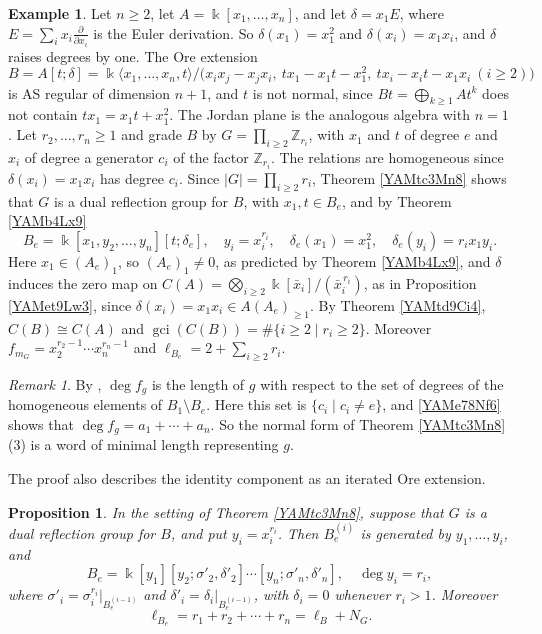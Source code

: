 \documentclass[reqno]{amsart}
\numberwithin{equation}{section}
\newtheorem{proposition}[equation]{Proposition}
\theoremstyle{definition}
\newtheorem{example}[equation]{Example}
\theoremstyle{remark}
\newtheorem{remark}[equation]{Remark}
\theoremstyle{plain}
\newcommand{\kk}{\Bbbk}
\DeclareMathOperator{\gci}{gci}
\begin{document}
\begin{example}\label{YAMex7Eu1}
Let $n\ge2$, let $A=\kk[x_1,\dots,x_n]$, and let $\delta=x_1E$, where $E=\sum_ix_i\frac{\partial}{\partial x_i}$ is the Euler derivation. So $\delta(x_1)=x_1^2$ and $\delta(x_i)=x_1x_i$, and $\delta$ raises degrees by one. The Ore extension
\[
B=A[t;\delta]=\kk\langle x_1,\dots,x_n,t\rangle/\big(x_ix_j-x_jx_i,\ tx_1-x_1t-x_1^2,\ tx_i-x_it-x_1x_i\ (i\ge2)\big)
\]
is AS regular of dimension $n+1$, and $t$ is not normal, since $Bt=\bigoplus_{k\ge1}At^k$ does not contain $tx_1=x_1t+x_1^2$. The Jordan plane is the analogous algebra with $n=1$. Let $r_2,\dots,r_n\ge1$ and grade $B$ by $G=\prod_{i\ge2}\mathbb Z_{r_i}$, with $x_1$ and $t$ of degree $e$ and $x_i$ of degree a generator $c_i$ of the factor $\mathbb Z_{r_i}$. The relations are homogeneous since $\delta(x_i)=x_1x_i$ has degree $c_i$. Since $|G|=\prod_{i\ge2}r_i$, Theorem \ref{YAMtc3Mn8} shows that $G$ is a dual reflection group for $B$, with $x_1,t\in B_e$, and by Theorem \ref{YAMb4Lx9}
\[
B_e=\kk[x_1,y_2,\dots,y_n][t;\delta_e],\quad y_i=x_i^{r_i},\quad\delta_e(x_1)=x_1^2,\quad\delta_e(y_i)=r_ix_1y_i.
\]
Here $x_1\in(A_e)_1$, so $(A_e)_1\neq0$, as predicted by Theorem \ref{YAMb4Lx9}, and $\delta$ induces the zero map on $C(A)=\bigotimes_{i\ge2}\kk[\bar x_i]/(\bar x_i^{\,r_i})$, as in Proposition \ref{YAMet9Lw3}, since $\delta(x_i)=x_1x_i\in A(A_e)_{\ge1}$. By Theorem \ref{YAMtd9Ci4}, $C(B)\cong C(A)$ and $\gci(C(B))=\#\{i\ge2\mid r_i\ge2\}$. Moreover $f_{m_G}=x_2^{r_2-1}\cdots x_n^{r_n-1}$ and $\ell_{B_e}=2+\sum_{i\ge2}r_i$.
\end{example}

\begin{remark}\label{YAMrm6Br1}
By \cite[Theorem 0.3(3)]{KKZ}, $\deg f_g$ is the length of $g$ with respect to the set of degrees of the homogeneous elements of $B_1\setminus B_e$. Here this set is $\{c_i\mid c_i\neq e\}$, and \eqref{YAMe78Nf6} shows that $\deg f_g=a_1+\cdots+a_n$. So the normal form of Theorem \ref{YAMtc3Mn8}(3) is a word of minimal length representing $g$.
\end{remark}

The proof also describes the identity component as an iterated Ore extension.

\begin{proposition}\label{YAMp7Ie3}
In the setting of Theorem \ref{YAMtc3Mn8}, suppose that $G$ is a dual reflection group for $B$, and put $y_i=x_i^{r_i}$. Then $B^{(i)}_e$ is generated by $y_1,\dots,y_i$, and
\begin{equation}\label{YAMe77Ie5}
B_e=\kk[y_1][y_2;\sigma'_2,\delta'_2]\cdots[y_n;\sigma'_n,\delta'_n],\quad\deg y_i=r_i,
\end{equation}
where $\sigma'_i=\sigma_i^{r_i}|_{B^{(i-1)}_e}$ and $\delta'_i=\delta_i|_{B^{(i-1)}_e}$, with $\delta_i=0$ whenever $r_i>1$. Moreover
\begin{equation}\label{YAMe77Ie6}
\ell_{B_e}=r_1+r_2+\cdots+r_n=\ell_B+N_G.
\end{equation}
\end{proposition}
\end{document}
